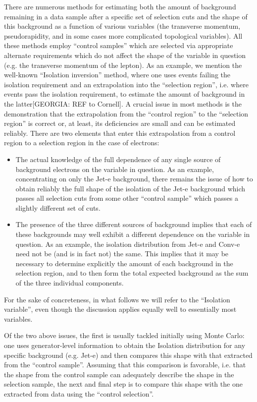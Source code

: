 There are numerous methods for estimating both the amount of background remaining in a data sample after a specific set of selection cuts and the shape of this background as a function of various variables (the transverse momentum, pseudorapidity, and in some cases more complicated topological variables).  All these methods employ ``control samples'' which are selected via appropriate alternate requirements which do not affect the shape of the variable in question (e.g. the transverse momentum of the lepton).  As an example, we mention the well-known ``Isolation inversion'' method, where one uses events failing the isolation requirement and an extrapolation into the ``selection region'', i.e. where events pass the isolation requirement, to estimate the amount of background in the latter[GEORGIA: REF to Cornell].  A crucial issue in most methods is the demonstration that the extrapolation from the ``control region'' to the ``selection region'' is correct or, at least, its deficiencies are small and can be estimated reliably.  There are two elements that enter this extrapolation from a control region to a selection region in the case of electrons:
\begin{itemize}
\item The actual knowledge of the full dependence of any single source of background electrons on the variable in question.  As an example, concentrating on only the Jet-e background, there remains the issue of how to obtain reliably the full shape of the isolation of the Jet-e background which passes all selection cuts from some other ``control sample'' which passes a slightly different set of cuts.
\item The presence of the three different sources of background implies that each of these backgrounds may well exhibit a different dependence on the variable in question.  As an example, the isolation distribution from Jet-e and Conv-e need not be (and is in fact not) the same.  This implies that it may be necessary to determine explicitly the amount of each background in the selection region, and to then form the total expected background as the sum of the three individual components.
\end{itemize}
For the sake of concreteness, in what follows we will refer to the ``Isolation variable'', even though the discussion applies equally well to essentially most variables.

Of the two above issues, the first is usually tackled initially using Monte Carlo: one uses generator-level information to obtain the Isolation distribution for any specific background (e.g. Jet-e) and then compares this shape with that extracted from the ``control sample''.  Assuming that this comparison is favorable, i.e. that the shape from the control sample can adequately describe the shape in the selection sample, the next and final step is to compare this shape with the one extracted from data using the ``control selection''. 

